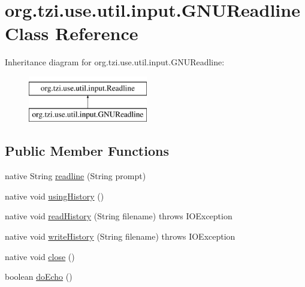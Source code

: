\hypertarget{classorg_1_1tzi_1_1use_1_1util_1_1input_1_1_g_n_u_readline}{\section{org.\-tzi.\-use.\-util.\-input.\-G\-N\-U\-Readline Class Reference}
\label{classorg_1_1tzi_1_1use_1_1util_1_1input_1_1_g_n_u_readline}
}
Inheritance diagram for org.\-tzi.\-use.\-util.\-input.\-G\-N\-U\-Readline\-:\begin{figure}[H]
\begin{center}
\leavevmode
\includegraphics[height=2.000000cm]{classorg_1_1tzi_1_1use_1_1util_1_1input_1_1_g_n_u_readline}
\end{center}
\end{figure}
\subsection*{Public Member Functions}
\begin{DoxyCompactItemize}
\item 
native String \hyperlink{classorg_1_1tzi_1_1use_1_1util_1_1input_1_1_g_n_u_readline_ad8461200245c8156e1bde85cbf6c7010}{readline} (String prompt)
\item 
native void \hyperlink{classorg_1_1tzi_1_1use_1_1util_1_1input_1_1_g_n_u_readline_a40fbc46ebd08f2f256168f16b2835663}{using\-History} ()
\item 
native void \hyperlink{classorg_1_1tzi_1_1use_1_1util_1_1input_1_1_g_n_u_readline_a40202e07415ca8975876d6ccd31b071a}{read\-History} (String filename)  throws I\-O\-Exception
\item 
native void \hyperlink{classorg_1_1tzi_1_1use_1_1util_1_1input_1_1_g_n_u_readline_a75078c6d34f2c9c797d78a794f3feae1}{write\-History} (String filename)  throws I\-O\-Exception
\item 
native void \hyperlink{classorg_1_1tzi_1_1use_1_1util_1_1input_1_1_g_n_u_readline_a2050054139054c058be16b1ce40fe101}{close} ()
\item 
boolean \hyperlink{classorg_1_1tzi_1_1use_1_1util_1_1input_1_1_g_n_u_readline_a3c1b21f644e26bd354c08bc910bc59d7}{do\-Echo} ()
\end{DoxyCompactItemize}


